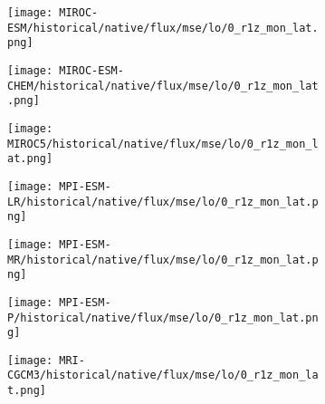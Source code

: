 \documentclass[preview]{standalone}
\begin{document}
\begin{figure}
  \begin{subfigure}[t]{\textwidth}
    \texttt{[image: MIROC-ESM/historical/native/flux/mse/lo/0\_r1z\_mon\_lat.png]}
  \end{subfigure}
\end{figure}

\begin{figure}
  \begin{subfigure}[t]{\textwidth}
    \texttt{[image: MIROC-ESM-CHEM/historical/native/flux/mse/lo/0\_r1z\_mon\_lat.png]}
  \end{subfigure}
\end{figure}

\begin{figure}
  \begin{subfigure}[t]{\textwidth}
    \texttt{[image: MIROC5/historical/native/flux/mse/lo/0\_r1z\_mon\_lat.png]}
  \end{subfigure}
\end{figure}

\begin{figure}
  \begin{subfigure}[t]{\textwidth}
    \texttt{[image: MPI-ESM-LR/historical/native/flux/mse/lo/0\_r1z\_mon\_lat.png]}
  \end{subfigure}
\end{figure}

\begin{figure}
  \begin{subfigure}[t]{\textwidth}
    \texttt{[image: MPI-ESM-MR/historical/native/flux/mse/lo/0\_r1z\_mon\_lat.png]}
  \end{subfigure}
\end{figure}

\begin{figure}
  \begin{subfigure}[t]{\textwidth}
    \texttt{[image: MPI-ESM-P/historical/native/flux/mse/lo/0\_r1z\_mon\_lat.png]}
  \end{subfigure}
\end{figure}

\begin{figure}
  \begin{subfigure}[t]{\textwidth}
    \texttt{[image: MRI-CGCM3/historical/native/flux/mse/lo/0\_r1z\_mon\_lat.png]}
  \end{subfigure}
\end{figure}
\end{document}
